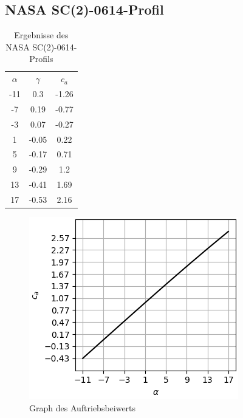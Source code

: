 \subsection{NASA SC(2)-0614-Profil}
\begin{minipage}{0.45\textwidth}
\begin{table}[H]
    \centering
    \begin{tabular}{c|cc}
    $\alpha$ & $\gamma$ & $c_a$ \\
        -11 & 0.3 & -1.26 \\ 
-7 & 0.19 & -0.77 \\ 
-3 & 0.07 & -0.27 \\ 
1 & -0.05 & 0.22 \\ 
5 & -0.17 & 0.71 \\ 
9 & -0.29 & 1.2 \\ 
13 & -0.41 & 1.69 \\ 
17 & -0.53 & 2.16 \\ 

    \end{tabular}
    \label{tab:nlf}
    \caption{Ergebnisse des NASA SC(2)-0614-Profils}
\end{table}
\end{minipage}
\hfill
\begin{minipage}{0.45\textwidth}
\begin{figure}[H]
    \centering
    \includegraphics[scale=0.6]{figures/nlf105ca.png}
    \caption{Graph des Auftriebsbeiwerts}
    \label{fig:nlfca}
\end{figure}
\end{minipage}

